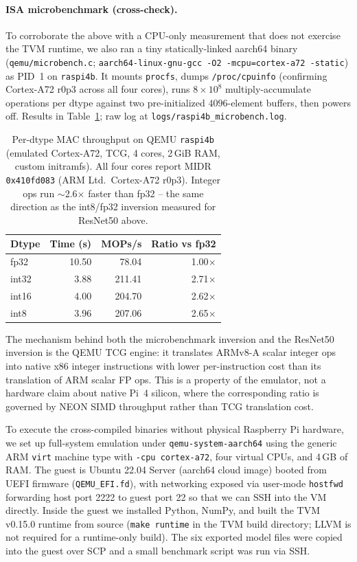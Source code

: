 \documentclass[11pt,a4paper]{article}
\begin{document}
\paragraph{ISA microbenchmark (cross-check).} To corroborate the above with a CPU-only measurement that does not exercise the TVM runtime, we also ran a tiny statically-linked aarch64 binary (\texttt{qemu/microbench.c}; \texttt{aarch64-linux-gnu-gcc -O2 -mcpu=cortex-a72 -static}) as PID~1 on \texttt{raspi4b}. It mounts \texttt{procfs}, dumps \texttt{/proc/cpuinfo} (confirming Cortex-A72 r0p3 across all four cores), runs $8 \times 10^8$ multiply-accumulate operations per dtype against two pre-initialized $4096$-element buffers, then powers off. Results in Table~\ref{tab:raspi4b-microbench}; raw log at \texttt{logs/raspi4b\_microbench.log}.

\begin{table}[h]
\centering
\begin{tabular}{lrrr}
\toprule
\textbf{Dtype} & \textbf{Time (s)} & \textbf{MOPs/s} & \textbf{Ratio vs fp32} \\
\midrule
fp32  & 10.50 &  78.04 & 1.00$\times$ \\
int32 &  3.88 & 211.41 & 2.71$\times$ \\
int16 &  4.00 & 204.70 & 2.62$\times$ \\
int8  &  3.96 & 207.06 & 2.65$\times$ \\
\bottomrule
\end{tabular}
\caption{Per-dtype MAC throughput on QEMU \texttt{raspi4b} (emulated Cortex-A72, TCG, 4 cores, 2\,GiB RAM, custom initramfs). All four cores report MIDR \texttt{0x410fd083} (ARM Ltd.\ Cortex-A72 r0p3). Integer ops run $\sim$2.6$\times$ faster than fp32 -- the same direction as the int8/fp32 inversion measured for ResNet50 above.}
\label{tab:raspi4b-microbench}
\end{table}

The mechanism behind both the microbenchmark inversion and the ResNet50 inversion is the QEMU TCG engine: it translates ARMv8-A scalar integer ops into native x86 integer instructions with lower per-instruction cost than its translation of ARM scalar FP ops. This is a property of the emulator, not a hardware claim about native Pi~4 silicon, where the corresponding ratio is governed by NEON SIMD throughput rather than TCG translation cost.

To execute the cross-compiled binaries without physical Raspberry Pi hardware, we set up full-system emulation under \texttt{qemu-system-aarch64} using the generic ARM \texttt{virt} machine type with \texttt{-cpu cortex-a72}, four virtual CPUs, and 4\,GB of RAM. The guest is Ubuntu 22.04 Server (aarch64 cloud image) booted from UEFI firmware (\texttt{QEMU\_EFI.fd}), with networking exposed via user-mode \texttt{hostfwd} forwarding host port 2222 to guest port 22 so that we can SSH into the VM directly. Inside the guest we installed Python, NumPy, and built the TVM v0.15.0 runtime from source (\texttt{make runtime} in the TVM build directory; LLVM is not required for a runtime-only build). The six exported model files were copied into the guest over SCP and a small benchmark script was run via SSH.
\end{document}

